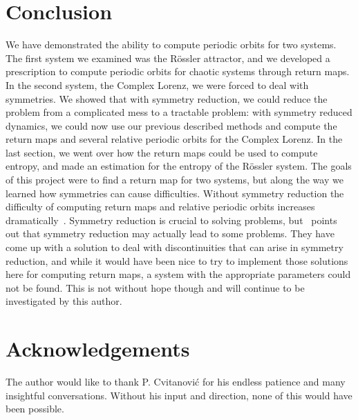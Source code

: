 \documentclass[10pt,letter]{article}
\begin{document}
\section{Conclusion}
We have demonstrated the ability to compute periodic orbits for two
systems.  The first system we examined was the R\"ossler attractor, and
we developed a prescription to compute periodic orbits for chaotic
systems through return maps.  In the second system, the Complex Lorenz,
we were forced to deal with symmetries.  We showed that with symmetry
reduction, we could reduce the problem from a complicated mess to a
tractable problem: with symmetry reduced dynamics, we could now use our
previous described methods and compute the return maps and several
relative periodic orbits for the Complex Lorenz.  In the last section, we
went over how the return maps could be used to compute entropy, and made
an estimation for the entropy of the R\"ossler system.  The goals of this
project were to find a return map for two systems, but along the way we
learned how symmetries can cause difficulties.  Without symmetry
reduction the difficulty of computing return maps and relative periodic
orbits increases dramatically~\cite{Eth}.  Symmetry reduction is crucial
to solving problems, but~\cite{Atl} points out that symmetry reduction
may actually lead to some problems.  They have come up with a solution to
deal with discontinuities that can arise in symmetry reduction, and while
it would have been nice to try to implement those solutions here for
computing return maps, a system with the appropriate parameters could not
be found.  This is not without hope though and will continue to be
investigated by this author.

\section{Acknowledgements}
The author would like to thank P. Cvitanovi\'c for his endless patience
and many insightful conversations.  Without his input and direction, none
of this would have been possible.
\end{document}
